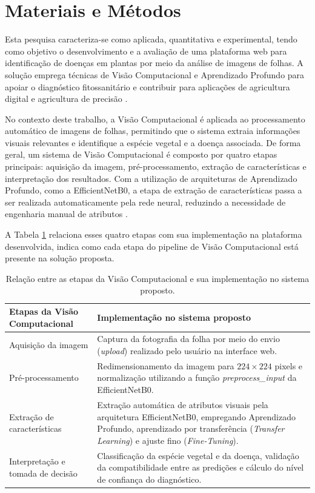 \documentclass[portuguese]{sbc2025}%
\begin{document}
\section{Materiais e Métodos}
\label{sec:Materiais e Métodos}

Esta pesquisa caracteriza-se como aplicada, quantitativa e experimental, tendo como objetivo o desenvolvimento e a avaliação de 
uma plataforma web para identificação de doenças em plantas por meio da análise de imagens de folhas. A solução 
emprega técnicas de Visão Computacional e Aprendizado Profundo para apoiar o diagnóstico fitossanitário e contribuir para 
aplicações de agricultura digital e agricultura de precisão \citep{ref1,ref2}.

No contexto deste trabalho, a Visão Computacional é aplicada ao processamento automático de imagens de folhas, permitindo que
o sistema extraia informações visuais relevantes e identifique a espécie vegetal e a doença associada. De forma geral, um 
sistema de Visão Computacional é composto por quatro etapas principais: aquisição da imagem, pré-processamento, extração de 
características e interpretação dos resultados. Com a utilização de arquiteturas de Aprendizado Profundo, como a EfficientNetB0,
a etapa de extração de características passa a ser realizada automaticamente pela rede neural, reduzindo a necessidade de 
engenharia manual de atributos \citep{ref23}.

A Tabela \ref{tab:etapas_vc} relaciona esses quatro etapas com sua implementação na plataforma desenvolvida, indica como
cada etapa do pipeline de Visão Computacional está presente na solução proposta.

\begin{table}[ht]
\centering
\caption{Relação entre as etapas da Visão Computacional e sua implementação no sistema proposto.}
\renewcommand{\arraystretch}{1.15}
\setlength{\tabcolsep}{5pt}
{\small
\begin{tabular}{p{3.8cm} p{4.5cm}}
\hline
\textbf{Etapas da Visão Computacional} & \textbf{Implementação no sistema proposto} \\
\hline
Aquisição da imagem &
Captura da fotografia da folha por meio do envio (\textit{upload}) realizado pelo usuário na interface web. \\

Pré-processamento &
Redimensionamento da imagem para $224\times224$ pixels e normalização utilizando a função \textit{preprocess\_input} da EfficientNetB0. \\

Extração de características &
Extração automática de atributos visuais pela arquitetura EfficientNetB0, empregando Aprendizado Profundo, aprendizado por 
transferência (\textit{Transfer Learning}) e ajuste fino (\textit{Fine-Tuning}). \\

Interpretação e tomada de decisão &
Classificação da espécie vegetal e da doença, validação da compatibilidade entre as predições e cálculo do nível de confiança do diagnóstico. \\
\hline
\end{tabular}
}
\label{tab:etapas_vc}
\end{table}
\end{document}

